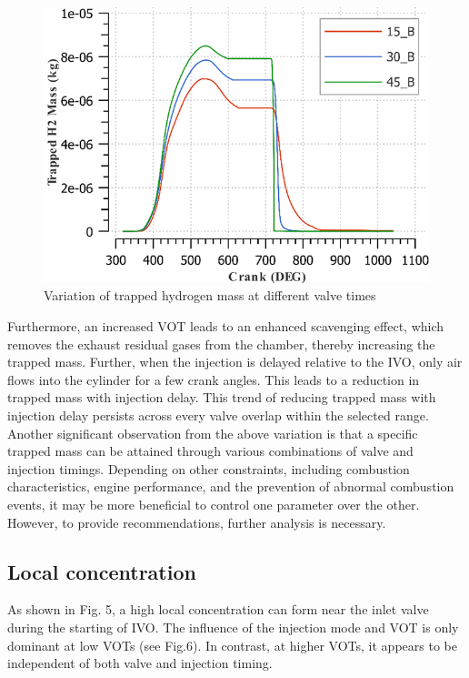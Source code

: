 \documentclass[conference]{IEEEtran}
\begin{document}
\begin{figure}[htbp]
    \centerline{\includegraphics{plots and graphs/4.png}}
    \caption{Variation of trapped hydrogen mass at different valve times}
    \label{plt_4}
    \end{figure}

Furthermore, an increased VOT leads to an enhanced scavenging effect, which removes the exhaust residual gases from the chamber, thereby increasing the trapped mass. Further, when the injection is delayed relative to the IVO, only air flows into the cylinder for a few crank angles. This leads to a reduction in trapped mass with injection delay. This trend of reducing trapped mass with injection delay persists across every valve overlap within the selected range.\\

Another significant observation from the above variation is that a specific trapped mass can be attained through various combinations of valve and injection timings. Depending on other constraints, including combustion characteristics, engine performance, and the prevention of abnormal combustion events, it may be more beneficial to control one parameter over the other. However, to provide recommendations, further analysis is necessary.

\subsection{Local concentration}
As shown in Fig. 5, a high local concentration can form near the inlet valve during the starting of IVO. The influence of the injection mode and VOT is only dominant at low VOTs (see Fig.6). In contrast, at higher VOTs, it appears to be independent of both valve and injection timing.\\
\end{document}
